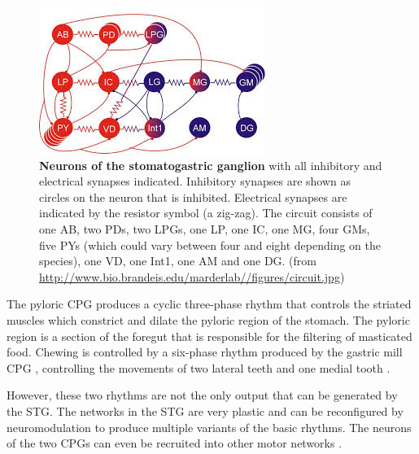 \begin{figure}[H]
	\centering
		\includegraphics[width=\columnwidth]{graphics/stg.jpg}
		\caption[Neurons of the stomatogastric ganglion.]{\textbf{Neurons of the stomatogastric ganglion} with all inhibitory and electrical synapses indicated. Inhibitory synapses are shown as circles on the neuron that is inhibited. Electrical synapses are indicated by the resistor symbol (a zig-zag). The circuit consists of one \acf{AB}, two \acfp{PD}, two \acfp{LPG}, one \acf{LP}, one \acf{IC}, one \acf{MG}, four \acfp{GM}, five \acfp{PY} (which could vary between four and eight depending on the species), one \acf{VD}, one \acf{Int1}, one \acf{AM} and one \acf{DG}. (from \url{http://www.bio.brandeis.edu/marderlab//figures/circuit.jpg})}
		\label{fig:STG}
\end{figure}


The pyloric \ac{CPG} produces a cyclic three-phase rhythm that controls the striated muscles which constrict and dilate the pyloric region of the stomach. The pyloric region is a section of the foregut that is responsible for the filtering of masticated food. Chewing is controlled by a six-phase rhythm produced by the gastric mill \ac{CPG} \cite{Marder2001, Selverston2005, Selverston2010}, controlling the movements of two lateral teeth and one medial tooth \cite{Heinzel1993}.

However, these two rhythms are not the only output that can be generated by the \ac{STG}. The networks in the \ac{STG} are very plastic and can be reconfigured by neuromodulation to produce multiple variants of the basic rhythms. The neurons of the two \acp{CPG} can even be recruited into other motor networks \cite{Johnson2003, Nusbaum2002}.


